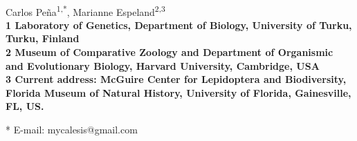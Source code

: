 \documentclass[10pt,letterpaper]{article}
\date{}
\begin{document}
\vspace*{0.35in}

\begin{flushleft}
{\Large
\textbf{}
}
\newline
\\
Carlos Pe\~na\textsuperscript{1,*},
Marianne Espeland\textsuperscript{2,3}
\\
\bf{1} Laboratory of Genetics, Department of Biology, University of Turku, Turku, Finland
\\
\bf{2} Museum of Comparative Zoology and Department of Organismic and Evolutionary Biology, Harvard University, Cambridge, USA
\\

% 
%

\bf{3} Current address: McGuire Center for Lepidoptera and Biodiversity,
Florida Museum of Natural History, University of Florida, Gainesville,
FL, US.



* E-mail: mycalesis@gmail.com
\end{flushleft}

\end{document}

